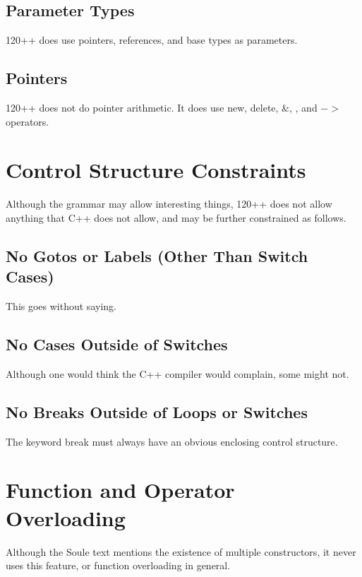 \subsection{Parameter Types}

120++ does use pointers, references, and base types as parameters.

\subsection{Pointers}

120++ does not do pointer arithmetic.  It does use new, delete, \&,
\*, and $->$ operators.

\section{Control Structure Constraints}

Although the grammar may allow interesting things, 120++ does not allow
anything that C++ does not allow, and may be further constrained as follows.

\subsection{No Gotos or Labels (Other Than Switch Cases)}

This goes without saying.

\subsection{No Cases Outside of Switches}

Although one would think the C++ compiler would complain, some might not.

\subsection{No Breaks Outside of Loops or Switches}

The keyword break must always have an obvious enclosing control structure.

\section{Function and Operator Overloading}

Although the Soule text mentions the existence of multiple constructors,
it never uses this feature, or function overloading in general.

